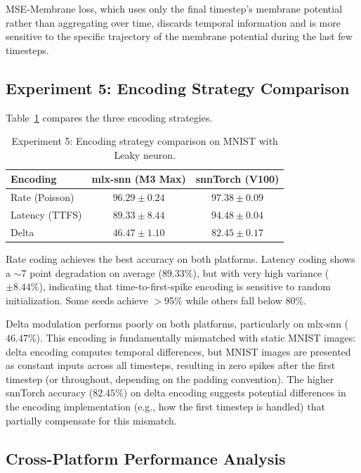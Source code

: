 \documentclass[11pt]{article}
\begin{document}
MSE-Membrane loss, which uses only the final timestep's membrane potential rather than aggregating over time, discards temporal information and is more sensitive to the specific trajectory of the membrane potential during the last few timesteps.

\subsection{Experiment 5: Encoding Strategy Comparison}

Table~\ref{tab:exp5} compares the three encoding strategies.

\begin{table}[H]
\centering
\caption{Experiment 5: Encoding strategy comparison on MNIST with Leaky neuron.}
\label{tab:exp5}
\small
\begin{tabular}{lcc}
\toprule
\textbf{Encoding} & \textbf{mlx-snn (M3 Max)} & \textbf{snnTorch (V100)} \\
\midrule
Rate (Poisson) & $\mathbf{96.29 \pm 0.24}$ & $\mathbf{97.38 \pm 0.09}$ \\
Latency (TTFS) & $89.33 \pm 8.44$ & $94.48 \pm 0.04$ \\
Delta & $46.47 \pm 1.10$ & $82.45 \pm 0.17$ \\
\bottomrule
\end{tabular}
\end{table}

Rate coding achieves the best accuracy on both platforms. Latency coding shows a $\sim$7 point degradation on average ($89.33\%$), but with very high variance ($\pm 8.44\%$), indicating that time-to-first-spike encoding is sensitive to random initialization. Some seeds achieve $>$95\% while others fall below 80\%.

Delta modulation performs poorly on both platforms, particularly on mlx-snn ($46.47\%$). This encoding is fundamentally mismatched with static MNIST images: delta encoding computes temporal differences, but MNIST images are presented as constant inputs across all timesteps, resulting in zero spikes after the first timestep (or throughout, depending on the padding convention). The higher snnTorch accuracy ($82.45\%$) on delta encoding suggests potential differences in the encoding implementation (e.g., how the first timestep is handled) that partially compensate for this mismatch.

\subsection{Cross-Platform Performance Analysis}
\end{document}
